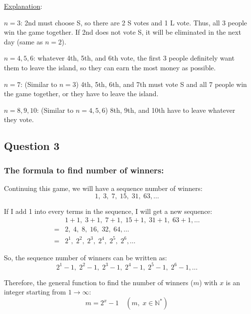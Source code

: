 \documentclass[12pt]{article}
\begin{document}
\noindent \underline{Explanation}:

\noindent $n= 3$: 2nd must choose S, so there are 2 S votes and 1 L vote. Thus, all 3 people win the game together. If 2nd does not vote S, it will be eliminated in the next day (same as $n=2$).
    
\noindent $n= 4, 5, 6$: whatever 4th, 5th, and 6th vote, the first 3 people definitely want them to leave the island, so they can earn the most money as possible.
    
\noindent $n= 7$: (Similar to $n= 3$) 4th, 5th, 6th, and 7th must vote S and all 7 people win the game together, or they have to leave the island.
    
\noindent $n= 8, 9, 10$: (Similar to $n= 4, 5, 6$) 8th, 9th, and 10th have to leave whatever they vote.

\vspace{1cm}

\subsection*{Question 3}


\subsubsection*{The formula to find number of winners:}

\noindent Continuing this game, we will have a sequence number of winners: 
$$1,\; 3,\; 7,\; 15,\; 31,\; 63, \dots $$

\noindent If I add 1 into every terms in the sequence, I will get a new sequence:
\begin{align*}
    & 1+1,\; 3+1,\; 7+1,\; 15+1,\; 31+1,\; 63+1, \dots \\
    =& 2,\; 4,\; 8,\; 16,\; 32,\; 64, \dots \\
    =& 2^1,\; 2^2,\; 2^3,\; 2^4,\; 2^5,\; 2^6, \dots
\end{align*}

\noindent So, the sequence number of winners can be written as:
$$2^1-1,\; 2^2-1,\; 2^3-1,\; 2^4-1,\; 2^5-1,\; 2^6-1, \dots$$

\noindent Therefore, the general function to find the number of winners ($m$) with $x$ is an integer starting from $1\to \infty$:
\begin{equation}
    m=2^x-1 \quad\left(m,\;x\in \mathbb{N^*} \right)
\end{equation} \par 
\end{document}
